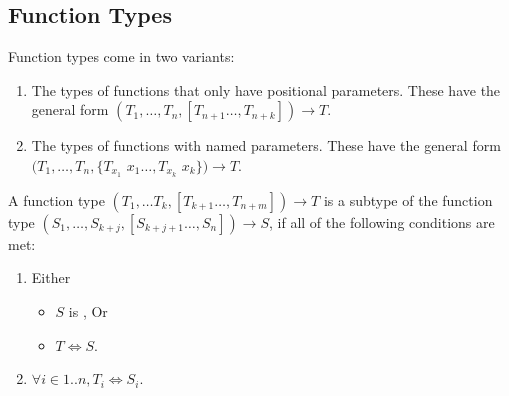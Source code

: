 \documentclass{article}
\begin{document}


\subsection{Function Types}

\LMHash{}
Function types come in two variants:
\begin{enumerate}
\item
The types of functions that only have positional parameters.
These have the general form $(T_1, \ldots, T_n, [T_{n+1} \ldots, T_{n+k}]) \rightarrow T$.
\item
The types of functions with named parameters.
These have the general form $(T_1, \ldots, T_n, \{T_{x_1}$ $x_1 \ldots, T_{x_k}$ $x_k\}) \rightarrow T$.
\end{enumerate}


\LMHash{}
A function type $(T_1, \ldots T_{k}, [T_{k+1} \ldots, T_{n+m}]) \rightarrow T$ is a subtype of the
function type $(S_1, \ldots, S_{k+j}, [S_{k+j+1} \ldots, S_{n}]) \rightarrow S$, if all of the following conditions are met:
\begin{enumerate}
\item Either
\begin{itemize}
\item $S$ is \VOID{}, Or
\item $T \Longleftrightarrow S$.
\end{itemize}
\item $\forall i \in 1 .. n, T_i \Longleftrightarrow S_i$.
\end{enumerate}
\end{document}
